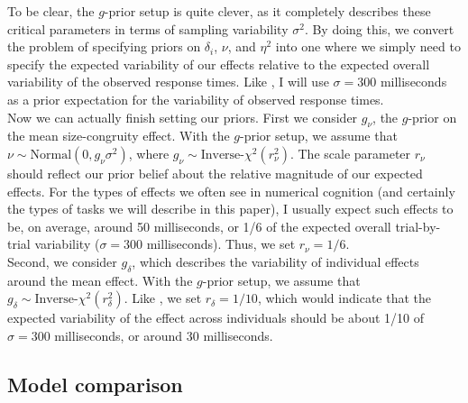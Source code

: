 \documentclass[12pt,twoside,a4paper]{article}
\begin{document}
To be clear, the \(g\)-prior setup is quite clever, as it completely describes these critical parameters in terms of sampling variability \(\sigma^2\). By doing this, we convert the problem of specifying priors on \(\delta_i\), \(\nu\), and \(\eta^2\) into one where we simply need to specify the expected variability of our effects relative to the expected overall variability of the observed response times. Like \citet{haaf2017}, I will use \(\sigma=300\) milliseconds as a prior expectation for the variability of observed response times.\\

Now we can actually finish setting our priors. First we consider \(g_{\nu}\), the \(g\)-prior on the mean size-congruity effect. With the \(g\)-prior setup, we assume that \(\nu \sim \text{Normal}(0, g_{\nu}\sigma^2)\), where \(g_{\nu} \sim \text{Inverse-}\chi^2(r_{\nu}^2)\). The scale parameter \(r_{\nu}\) should reflect our prior belief about the relative magnitude of our expected effects. For the types of effects we often see in numerical cognition (and certainly the types of tasks we will describe in this paper), I usually expect such effects to be, on average, around 50 milliseconds, or 1/6 of the expected overall trial-by-trial variability (\(\sigma = 300\) milliseconds). Thus, we set \(r_{\nu}=1/6\).\\

Second, we consider \(g_{\delta}\), which describes the variability of individual effects around the mean effect. With the \(g\)-prior setup, we assume that \(g_{\delta} \sim \text{Inverse-}\chi^2(r_{\delta}^2)\). Like \citet{haaf2017}, we set \(r_{\delta}=1/10\), which would indicate that the expected variability of the effect across individuals should be about 1/10 of \(\sigma=300\) milliseconds, or around 30 milliseconds.

\subsection{Model comparison}
\end{document}
